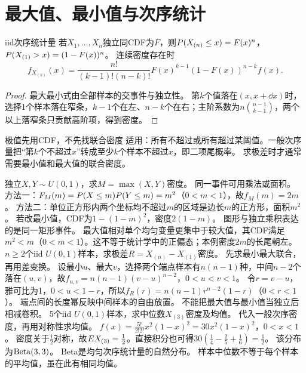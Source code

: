 \section{最大值、最小值与次序统计}\label{sec:34}
\begin{theorem}{iid次序统计量}
若$X_1,\ldots,X_n$独立同CDF为$F$，则$P(X_{(n)}\le x)=F(x)^n$，$P(X_{(1)}>x)=(1-F(x))^n$。
连续密度存在时
\[f_{X_{(k)}}(x)=\dfrac{n!}{(k-1)!(n-k)!}F(x)^{k-1}(1-F(x))^{n-k}f(x).\]
\end{theorem}
\begin{proof}
最大最小式由全部样本的交事件与独立性。
第$k$个值落在$(x,x+\dd x)$时，选择1个样本落在窄条，$k-1$个在左、$n-k$个在右；主阶系数为$n\binom{n-1}{k-1}$，两个以上落窄条只贡献高阶项，得到密度。
\end{proof}
\begin{method}{极值先用CDF，不先找联合密度}
适用：所有不超过或所有超过某阈值。一般次序量把“第$k$个不超过$x$”转成至少$k$个样本不超过$x$，即二项尾概率。
求极差时才通常需要最小值和最大值的联合密度。
\end{method}
{独立$X,Y\sim U(0,1)$，求$M=\max(X,Y)$密度。}
{同一事件可用乘法或面积。}
{方法一：$F_M(m)=P(X\le m)P(Y\le m)=m^2$（$0<m<1$），故$f_M(m)=2m$。
方法二：单位正方形内两个坐标均不超过$m$的区域是边长$m$的正方形，面积$m^2$。
若改最小值，CDF为$1-(1-m)^2$，密度$2(1-m)$。}
{图形与独立乘积表达的是同一矩形事件。}
{最大值相对单个均匀变量更集中于较大值，其CDF满足$m^2<m$（$0<m<1$）。这不等于统计学中的正偏态；本例密度$2m$的长尾朝左。}
{$n\ge2$个iid $U(0,1)$样本，求极差$R=X_{(n)}-X_{(1)}$密度。}
{先求最小最大联合，再用差变换。}
{设最小$u$、最大$v$，选择两个端点样本有$n(n-1)$种，中间$n-2$个落在$(u,v)$，故$f_{u,v}=n(n-1)(v-u)^{n-2}$，$0<u<v<1$。
令$r=v-u$，雅可比为1，$0<u<1-r$，所以$f_R(r)=n(n-1)r^{n-2}(1-r)$（$0<r<1$）。}
{端点间的长度幂反映中间样本的自由放置。}
{不能把最大值与最小值当独立后相减卷积。}
{5个iid $U(0,1)$样本，求中位数$X_{(3)}$密度及均值。}
{代入一般次序密度，再用对称性求均值。}
{$f(x)=\frac{5!}{2!2!}x^2(1-x)^2=30x^2(1-x)^2$，$0<x<1$。
密度关于$\frac{1}{2}$对称，故$E X_{(3)}=\frac{1}{2}$。直接积分也可得$30(\frac{1}{4}-\frac{2}{5}+\frac{1}{6})=\frac{1}{2}$。
该分布为$\operatorname{Beta}(3,3)$。}
{Beta是均匀次序统计量的自然分布。}
{样本中位数不等于每个样本的平均值，虽在此有相同均值。}

